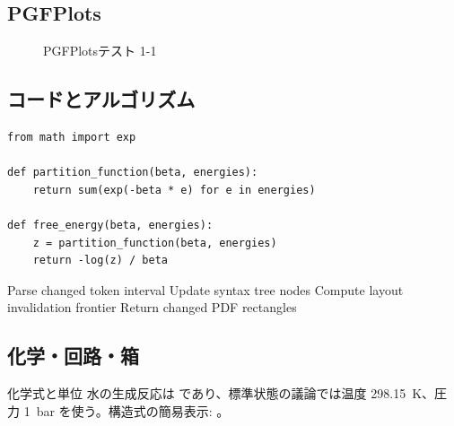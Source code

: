 \documentclass[12pt,a4paper,openany]{ltjsbook}
\theoremstyle{definition}
\theoremstyle{plain}
\theoremstyle{remark}
\begin{document}
\subsection{PGFPlots}
\begin{figure}[H]
\centering
{}
\caption{PGFPlotsテスト 1-1}\label{fig:pgfplots-1-1}
\end{figure}

\subsection{コードとアルゴリズム}
\begin{lstlisting}[style=pythonstyle,caption={Python風擬似コード 1-1}]
from math import exp

def partition_function(beta, energies):
    return sum(exp(-beta * e) for e in energies)

def free_energy(beta, energies):
    z = partition_function(beta, energies)
    return -log(z) / beta
\end{lstlisting}

\begin{algorithm}[H]
\caption{差分プレビュー更新アルゴリズム 1-1}
Parse changed token interval\;
Update syntax tree nodes\;
Compute layout invalidation frontier\;
Return changed PDF rectangles\;
\end{algorithm}

\subsection{化学・回路・箱}
\begin{greenbox}{化学式と単位}
水の生成反応は  であり、標準状態の議論では温度 \SI{298.15}{\kelvin}、圧力 \SI{1}{\bar} を使う。構造式の簡易表示: 。
\end{greenbox}
\end{document}
